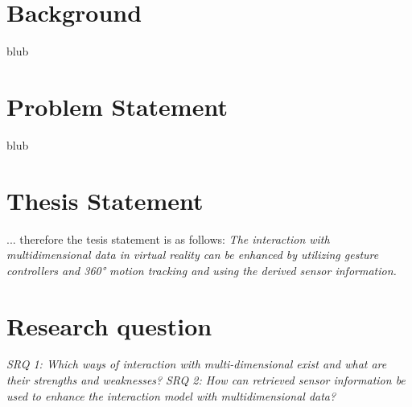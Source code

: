 
\section{Background}

blub



\section{Problem Statement}

blub



\section{Thesis Statement}
... therefore the tesis statement is as follows: \newline
\textit{The interaction with multidimensional data in virtual reality can be enhanced by utilizing gesture controllers and 360° motion tracking and using the derived sensor information.}


\section{Research question}

\textit{SRQ 1: Which ways of interaction with multi-dimensional exist and what are their strengths and weaknesses?}
\newline
\textit{SRQ 2: How can retrieved sensor information be used to enhance the interaction model with multidimensional data?}




